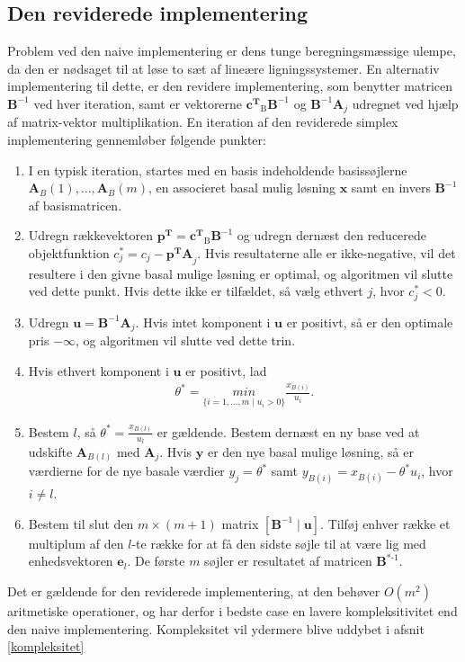 \subsection{Den reviderede implementering}
Problem ved den naive implementering er dens tunge beregningsmæssige ulempe, da den er nødsaget til at løse to sæt af lineære ligningssystemer. En alternativ implementering til dette, er den revidere implementering, som benytter matricen $\mathbf{B}^{-1}$ ved hver iteration, samt er  vektorerne $\mathbf{c^T}_{\text{B}}\mathbf{B}^{-1}$ og $\mathbf{B}^{-1}\mathbf{A}_j$ udregnet ved hjælp af matrix-vektor multiplikation. En iteration af den reviderede simplex implementering gennemløber følgende punkter: 
\begin{enumerate}
\item I en typisk iteration, startes med en basis indeholdende basissøjlerne $\mathbf{A}_B(1),\ldots,\mathbf{A}_B(m)$, en associeret basal mulig løsning $\mathbf{x}$ samt en invers $\mathbf{B}^{-1}$ af basismatricen. 
\item Udregn rækkevektoren $\mathbf{p^T}=\mathbf{c^T}_{\text{B}}\mathbf{B}^{-1}$ og udregn dernæst den reducerede objektfunktion $c_j^* = c_j - \mathbf{p^{T}A}_j$. Hvis resultaterne alle er ikke-negative, vil det resultere i den givne basal mulige løsning er optimal, og algoritmen vil slutte ved dette punkt. Hvis dette ikke er tilfældet, så vælg ethvert $j$, hvor $c_j^* < 0$.
\item Udregn $\mathbf{u}=\mathbf{B}^{-1}\mathbf{A}_j$. Hvis intet komponent i $\mathbf{u}$ er positivt, så er den optimale pris $-\infty$, og algoritmen vil slutte ved dette trin. 
%
%
\item Hvis ethvert komponent i $\mathbf{u}$ er positivt, lad 
\begin{align*}
\theta^*=\underset{\{i=1,\ldots,m \mid u_i>0\}}{min}\frac{x_{B(i)}}{u_i}.
\end{align*}
\item Bestem $l$, så $\theta^*=\frac{x_{B(l)}}{u_l}$ er gældende. Bestem dernæst en ny base ved at udskifte $\mathbf{A}_{B(l)}$ med $\mathbf{A}_j$. Hvis $\mathbf{y}$ er den nye basal mulige løsning, så er værdierne for de nye basale værdier $y_j=\theta^*$ samt $y_{B(i)}=x_{B(i)}-\theta^*u_i$, hvor $i \neq l$.
\item Bestem til slut den $m \times (m+1)$ matrix $\left [\mathbf{B}^{-1} \mid \mathbf{u} \right ]$. Tilføj enhver række et multiplum af den $l$-te række for at få den sidste søjle til at være lig med enhedsvektoren $\mathbf{e}_l$. De første $m$ søjler er resultatet af matricen $\mathbf{B}^{*\text{-1}}$.
\end{enumerate}
Det er gældende for den reviderede implementering, at den behøver $O(m^2)$ aritmetiske operationer, og har derfor i bedste case en lavere kompleksitivitet end den naive implementering. Kompleksitet vil ydermere blive uddybet i afsnit \ref{kompleksitet}
